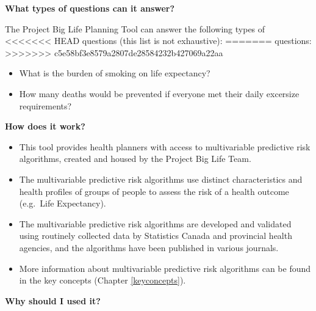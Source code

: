 \documentclass[]{book}
\providecommand{\tightlist}{%
  \setlength{\itemsep}{0pt}\setlength{\parskip}{0pt}}
\begin{document}
\textbf{What types of questions can it answer?}

The Project Big Life Planning Tool can answer the following types of
<<<<<<< HEAD
questions (this list is not exhaustive):
=======
questions:
>>>>>>> c5e58bf3e8579a2807de28584232b427069a22aa

\begin{itemize}
\tightlist
\item
  What is the burden of smoking on life expectancy?
\item
  How many deaths would be prevented if everyone met their daily
  excersize requirements?
\end{itemize}

\textbf{How does it work?}

\begin{itemize}
\item
  This tool provides health planners with access to multivariable
  predictive risk algorithms, created and housed by the Project Big Life
  Team.
\item
  The multivariable predictive risk algorithms use distinct
  characteristics and health profiles of groups of people to assess the
  risk of a health outcome (e.g.~Life Expectancy).
\item
  The multivariable predictive risk algorithms are developed and
  validated using routinely collected data by Statistics Canada and
  provincial health agencies, and the algorithms have been published in
  various journals.
\item
  More information about multivariable predictive risk algorithms can be
  found in the key concepts (Chapter \ref{keyconcepts}).
\end{itemize}

\textbf{Why should I used it?}
\end{document}
